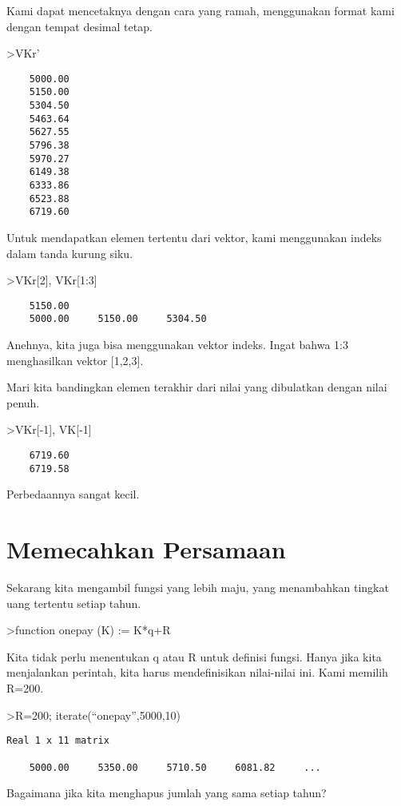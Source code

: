 \documentclass[
]{book}
\begin{document}
Kami dapat mencetaknya dengan cara yang ramah, menggunakan format kami dengan tempat desimal tetap.

\textgreater VKr'

\begin{verbatim}
    5000.00 
    5150.00 
    5304.50 
    5463.64 
    5627.55 
    5796.38 
    5970.27 
    6149.38 
    6333.86 
    6523.88 
    6719.60 
\end{verbatim}

Untuk mendapatkan elemen tertentu dari vektor, kami menggunakan indeks dalam tanda kurung siku.

\textgreater VKr{[}2{]}, VKr{[}1:3{]}

\begin{verbatim}
    5150.00 
    5000.00     5150.00     5304.50 
\end{verbatim}

Anehnya, kita juga bisa menggunakan vektor indeks. Ingat bahwa 1:3 menghasilkan vektor {[}1,2,3{]}.

Mari kita bandingkan elemen terakhir dari nilai yang dibulatkan dengan nilai penuh.

\textgreater VKr{[}-1{]}, VK{[}-1{]}

\begin{verbatim}
    6719.60 
    6719.58 
\end{verbatim}

Perbedaannya sangat kecil.

\section{Memecahkan Persamaan}\label{memecahkan-persamaan}

Sekarang kita mengambil fungsi yang lebih maju, yang menambahkan tingkat uang tertentu setiap tahun.

\textgreater function onepay (K) := K*q+R

Kita tidak perlu menentukan q atau R untuk definisi fungsi. Hanya jika kita menjalankan perintah, kita harus mendefinisikan nilai-nilai ini. Kami memilih R=200.

\textgreater R=200; iterate(``onepay'',5000,10)

\begin{verbatim}
Real 1 x 11 matrix

    5000.00     5350.00     5710.50     6081.82     ...
\end{verbatim}

Bagaimana jika kita menghapus jumlah yang sama setiap tahun?
\end{document}
